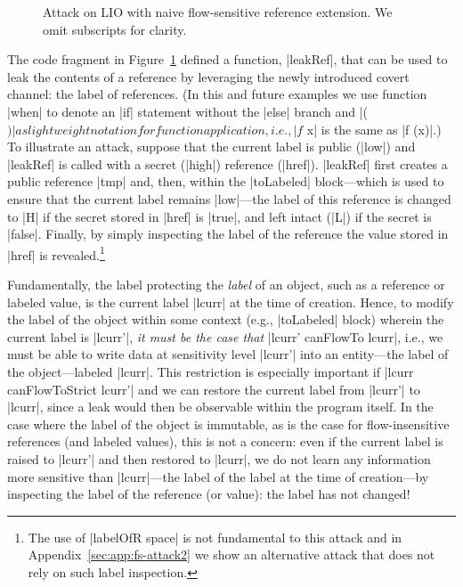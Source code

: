 \begin{figure}[t]
\small
{}
\cut{$}
\caption{Attack on LIO with naive flow-sensitive reference extension. We omit
subscripts for clarity.  \label{fig:fs-attack}}
\end{figure}

The code fragment in Figure~\ref{fig:fs-attack} defined a function,
|leakRef|, that can be used to leak the contents of a reference by
leveraging the newly introduced covert channel: the label of references.
%
(In this and future examples we use function |when| to denote an |if|
statement without the |else| branch and |($)| as lightweight notation
for function application, i.e., |f $ x| is the same as |f (x)|.)
%
To illustrate an attack, suppose that the current label is public
(|low|) and |leakRef| is called with a secret (|high|) reference
(|href|).
%
|leakRef| first creates a public reference |tmp| and, then, within the
|toLabeled| block---which is used to ensure that the current label remains
|low|---the label of this reference is changed to |H| if the secret stored in
|href| is |true|, and left intact (|L|) if the secret is |false|.
%
Finally, by simply inspecting the label of the reference the value stored in
|href| is revealed.\footnote{%
The use of |labelOfR space| is not fundamental to this attack and in
Appendix~\ref{sec:app:fs-attack2} we show an alternative attack that
does not rely on such label inspection.
}

Fundamentally, the label protecting the \emph{label} of an object,
such as a reference or labeled value, is the current label |lcurr| at
the time of creation.
%
Hence, to modify the label of the object within some context (e.g., |toLabeled|
block) wherein the current label is |lcurr'|, \emph{it must be the case that} |lcurr'
canFlowTo lcurr|, i.e., we must be able to write data at sensitivity level
|lcurr'| into an entity---the label of the object---labeled |lcurr|.
%
This restriction is especially important if |lcurr canFlowToStrict
lcurr'| and we can restore the current label from |lcurr'| to |lcurr|, 
since a leak would then be observable within the program itself.
%
In the case where the label of the object is immutable, as is the case for
flow-insensitive references (and labeled values), this is not a concern: even if
the current label is raised to |lcurr'| and then restored to |lcurr|, we do not
learn any information more sensitive than |lcurr|---the label of the label at the
time of creation---by inspecting the label of the reference (or
value): the label has not changed!
%

